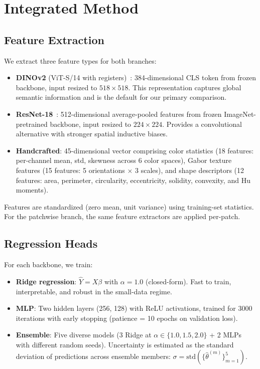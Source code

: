 \documentclass[11pt,a4paper]{article}
\newcommand{\thetahat}{\hat{\theta}}
\begin{document}
\section{Integrated Method}
\label{sec:method}

\subsection{Feature Extraction}

We extract three feature types for both branches:

\begin{itemize}[nosep]
    \item \textbf{DINOv2} (ViT-S/14 with registers)~\citep{oquab2024dinov2}: 384-dimensional CLS token from frozen backbone, input resized to $518 \times 518$. This representation captures global semantic information and is the default for our primary comparison.
    \item \textbf{ResNet-18}~\citep{he2016resnet}: 512-dimensional average-pooled features from frozen ImageNet-pretrained backbone, input resized to $224 \times 224$. Provides a convolutional alternative with stronger spatial inductive biases.
    \item \textbf{Handcrafted}: 45-dimensional vector comprising color statistics (18 features: per-channel mean, std, skewness across 6 color spaces), Gabor texture features (15 features: 5 orientations $\times$ 3 scales), and shape descriptors (12 features: area, perimeter, circularity, eccentricity, solidity, convexity, and Hu moments).
\end{itemize}

Features are standardized (zero mean, unit variance) using training-set statistics.
For the patchwise branch, the same feature extractors are applied per-patch.

\subsection{Regression Heads}

For each backbone, we train:
\begin{itemize}[nosep]
    \item \textbf{Ridge regression}: $\hat{Y} = X\beta$ with $\alpha = 1.0$ (closed-form). Fast to train, interpretable, and robust in the small-data regime.
    \item \textbf{MLP}: Two hidden layers (256, 128) with ReLU activations, trained for 3000 iterations with early stopping (patience = 10 epochs on validation loss).
    \item \textbf{Ensemble}: Five diverse models (3 Ridge at $\alpha \in \{1.0, 1.5, 2.0\}$ + 2 MLPs with different random seeds). Uncertainty is estimated as the standard deviation of predictions across ensemble members: $\sigma = \mathrm{std}(\{\thetahat^{(m)}\}_{m=1}^{5})$.
\end{itemize}
\end{document}
